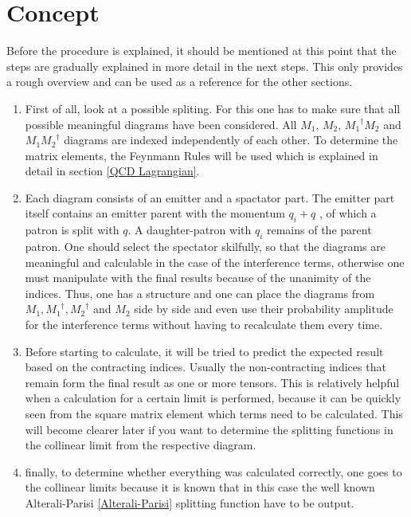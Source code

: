\section*{Concept}
\label{Concept}
Before the procedure is explained, it should be mentioned at this point that the steps are gradually explained in more detail in the next steps. This only provides a rough overview and can be used as a reference for the other sections.
\renewcommand{\labelenumi}{\roman{enumi})}
\begin{enumerate}
\item First of all, look at a possible spliting. For this one has to make sure that all possible meaningful diagrams have been considered.
All $ M_1 $, $ M_2 $, $ {M_1}^{\dagger} M_2 $ and $ M_1{M_2}^{\dagger}$ diagrams are indexed independently of each other.  To determine the matrix elements, the Feynmann Rules will be used which is explained in detail in section \ref{QCD Lagrangian}.
\item Each diagram consists of an emitter and a spactator part.
The emitter part itself contains an emitter parent with the momentum $ q_i+q $ , of which a patron is split with $ q $. A daughter-patron with $ q_i $ remains of the parent patron. One should select the spectator skilfully, so that the diagrams are meaningful and calculable in the case of the interference terms, otherwise one must manipulate with the final results because of the unanimity of the indices. Thus, one has a structure and one can place the diagrams from $ M_1, {M_1}^{\dagger}, {M_2}^{\dagger}$ and $ M_2 $ side by side and even use their probability amplitude for the interference terms without having to recalculate them every time. 
\item Before starting to calculate, it will be tried to predict the expected result based on the contracting indices. Usually the non-contracting indices that remain form the final result as one or more tensors. This is relatively helpful when a calculation for a certain limit is performed, because it can be quickly seen from the square matrix element which terms need to be calculated.
This will become clearer later if you want to determine the splitting functions in the collinear limit from the respective diagram.
\item finally, to determine whether everything was calculated correctly, one goes to the collinear limits because it is known that in this case the well known Alterali-Parisi \ref{Alterali-Parisi} splitting function have to be output.
\end{enumerate}